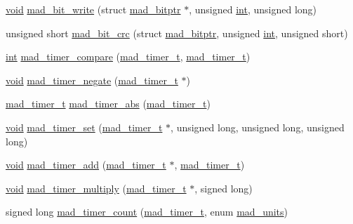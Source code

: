 \begin{DoxyCompactItemize}
\item 
\hyperlink{sound_8c_ae35f5844602719cf66324f4de2a658b3}{void} \hyperlink{lib-src_2libmad_2msvc_09_09_2mad_8h_a489b2b30e963c86f152a25a8036547c6}{mad\+\_\+bit\+\_\+write} (struct \hyperlink{structmad__bitptr}{mad\+\_\+bitptr} $\ast$, unsigned \hyperlink{xmltok_8h_a5a0d4a5641ce434f1d23533f2b2e6653}{int}, unsigned long)
\item 
unsigned short \hyperlink{lib-src_2libmad_2msvc_09_09_2mad_8h_a3adcbec8bcd4cecfb5ba5ae2d271af2a}{mad\+\_\+bit\+\_\+crc} (struct \hyperlink{structmad__bitptr}{mad\+\_\+bitptr}, unsigned \hyperlink{xmltok_8h_a5a0d4a5641ce434f1d23533f2b2e6653}{int}, unsigned short)
\item 
\hyperlink{xmltok_8h_a5a0d4a5641ce434f1d23533f2b2e6653}{int} \hyperlink{lib-src_2libmad_2msvc_09_09_2mad_8h_af3b4aae92a345192ac505a06d078a4f3}{mad\+\_\+timer\+\_\+compare} (\hyperlink{structmad__timer__t}{mad\+\_\+timer\+\_\+t}, \hyperlink{structmad__timer__t}{mad\+\_\+timer\+\_\+t})
\item 
\hyperlink{sound_8c_ae35f5844602719cf66324f4de2a658b3}{void} \hyperlink{lib-src_2libmad_2msvc_09_09_2mad_8h_aeb441a3c0136757d7fcea625fc4787ed}{mad\+\_\+timer\+\_\+negate} (\hyperlink{structmad__timer__t}{mad\+\_\+timer\+\_\+t} $\ast$)
\item 
\hyperlink{structmad__timer__t}{mad\+\_\+timer\+\_\+t} \hyperlink{lib-src_2libmad_2msvc_09_09_2mad_8h_a834ec927737bc74efc6ab49ce7b6d767}{mad\+\_\+timer\+\_\+abs} (\hyperlink{structmad__timer__t}{mad\+\_\+timer\+\_\+t})
\item 
\hyperlink{sound_8c_ae35f5844602719cf66324f4de2a658b3}{void} \hyperlink{lib-src_2libmad_2msvc_09_09_2mad_8h_a27bfecee054e0d86ce736cdb129a6531}{mad\+\_\+timer\+\_\+set} (\hyperlink{structmad__timer__t}{mad\+\_\+timer\+\_\+t} $\ast$, unsigned long, unsigned long, unsigned long)
\item 
\hyperlink{sound_8c_ae35f5844602719cf66324f4de2a658b3}{void} \hyperlink{lib-src_2libmad_2msvc_09_09_2mad_8h_a15f3a8890f8949bd9ab972b2bb53a747}{mad\+\_\+timer\+\_\+add} (\hyperlink{structmad__timer__t}{mad\+\_\+timer\+\_\+t} $\ast$, \hyperlink{structmad__timer__t}{mad\+\_\+timer\+\_\+t})
\item 
\hyperlink{sound_8c_ae35f5844602719cf66324f4de2a658b3}{void} \hyperlink{lib-src_2libmad_2msvc_09_09_2mad_8h_a8949ad8ca853994283663d9e6fec06e9}{mad\+\_\+timer\+\_\+multiply} (\hyperlink{structmad__timer__t}{mad\+\_\+timer\+\_\+t} $\ast$, signed long)
\item 
signed long \hyperlink{lib-src_2libmad_2msvc_09_09_2mad_8h_ac145e00368b6f5c220e4b46b993e48dd}{mad\+\_\+timer\+\_\+count} (\hyperlink{structmad__timer__t}{mad\+\_\+timer\+\_\+t}, enum \hyperlink{lib-src_2libmad_2msvc_09_09_2mad_8h_a8b5cf795da949ab23ac909021d884fff}{mad\+\_\+units})

\end{DoxyCompactItemize}
